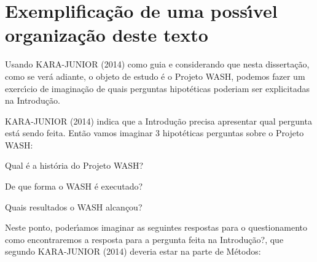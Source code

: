 \documentclass[
12pt,		%
openright,	%
twoside,  %
a4paper,			%
chapter=TITLE,		%
english,			%
french,				%
spanish,			%
brazil				%
]{USPSC-classe/USPSC_RedarTex}
\begin{document}
\section[Exemplifica\c{c}\~ao de uma poss\'{\i}vel organiza\c{c}\~ao deste texto]{Exemplifica\c{c}\~ao de uma poss\'{\i}vel organiza\c{c}\~ao deste texto}\label{Exemplifica\c{c}\~ao de uma poss\'{\i}vel organiza\c{c}\~ao deste texto}
Usando  KARA-JUNIOR (2014) como guia e considerando que nesta disserta\c{c}\~ao, como se ver\'a adiante, o objeto de estudo \'e o Projeto WASH, podemos fazer um exerc\'{\i}cio de imagina\c{c}\~ao de quais perguntas hipot\'eticas poderiam ser explicitadas na Introdu\c{c}\~ao.








 KARA-JUNIOR (2014) indica que a Introdu\c{c}\~ao precisa apresentar qual pergunta est\'a sendo feita. Ent\~ao vamos imaginar 3 hipot\'eticas perguntas sobre o Projeto WASH:









\begin{alineas}
\item \textquotedbl Qual \'e a hist\'oria do Projeto WASH?\textquotedbl 
\item \textquotedbl De que forma o WASH \'e executado?\textquotedbl 
\item \textquotedbl Quais resultados o WASH alcan\c{c}ou?\textquotedbl 
\end{alineas}

Neste ponto, poder\'{\i}amos imaginar as seguintes respostas para o questionamento \textquotedbl como encontraremos a resposta para a pergunta feita na Introdu\c{c}\~ao?\textquotedbl , que segundo KARA-JUNIOR (2014) deveria estar na parte de M\'etodos:
\end{document}
